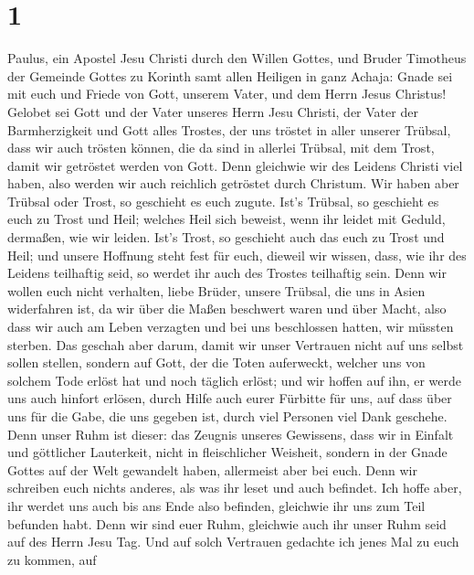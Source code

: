 \hypertarget{section}{%
\section{1}\label{section}}

 Paulus, ein Apostel Jesu Christi durch den Willen Gottes,
und Bruder Timotheus der Gemeinde Gottes zu Korinth samt allen Heiligen
in ganz Achaja:  Gnade sei mit euch und Friede von Gott,
unserem Vater, und dem Herrn Jesus Christus!  Gelobet sei
Gott und der Vater unseres Herrn Jesu Christi, der Vater der
Barmherzigkeit und Gott alles Trostes,  der uns tröstet in
aller unserer Trübsal, dass wir auch trösten können, die da sind in
allerlei Trübsal, mit dem Trost, damit wir getröstet werden von Gott.
 Denn gleichwie wir des Leidens Christi viel haben, also
werden wir auch reichlich getröstet durch Christum.  Wir
haben aber Trübsal oder Trost, so geschieht es euch zugute. Ist's
Trübsal, so geschieht es euch zu Trost und Heil; welches Heil sich
beweist, wenn ihr leidet mit Geduld, dermaßen, wie wir leiden. Ist's
Trost, so geschieht auch das euch zu Trost und Heil;  und
unsere Hoffnung steht fest für euch, dieweil wir wissen, dass, wie ihr
des Leidens teilhaftig seid, so werdet ihr auch des Trostes teilhaftig
sein.  Denn wir wollen euch nicht verhalten, liebe Brüder,
unsere Trübsal, die uns in Asien widerfahren ist, da wir über die Maßen
beschwert waren und über Macht, also dass wir auch am Leben verzagten
 und bei uns beschlossen hatten, wir müssten sterben. Das
geschah aber darum, damit wir unser Vertrauen nicht auf uns selbst
sollen stellen, sondern auf Gott, der die Toten auferweckt,
 welcher uns von solchem Tode erlöst hat und noch täglich
erlöst; und wir hoffen auf ihn, er werde uns auch hinfort erlösen,
 durch Hilfe auch eurer Fürbitte für uns, auf dass über uns
für die Gabe, die uns gegeben ist, durch viel Personen viel Dank
geschehe.  Denn unser Ruhm ist dieser: das Zeugnis unseres
Gewissens, dass wir in Einfalt und göttlicher Lauterkeit, nicht in
fleischlicher Weisheit, sondern in der Gnade Gottes auf der Welt
gewandelt haben, allermeist aber bei euch.  Denn wir
schreiben euch nichts anderes, als was ihr leset und auch befindet. Ich
hoffe aber, ihr werdet uns auch bis ans Ende also befinden, gleichwie
ihr uns zum Teil befunden habt.  Denn wir sind euer Ruhm,
gleichwie auch ihr unser Ruhm seid auf des Herrn Jesu Tag. 
Und auf solch Vertrauen gedachte ich jenes Mal zu euch zu kommen, auf
